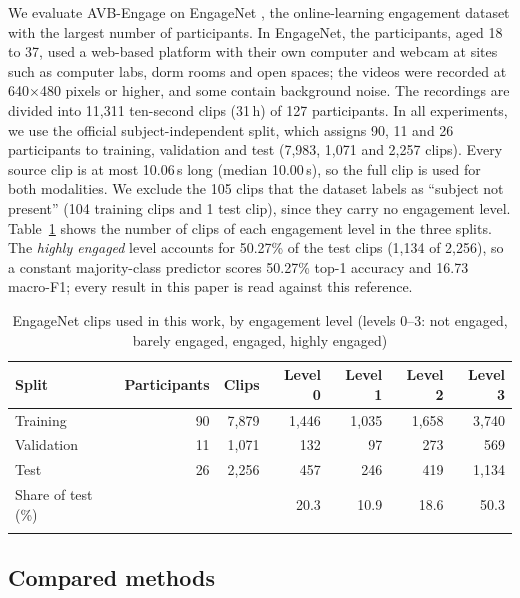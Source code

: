 \documentclass[pdflatex,iicol,sn-basic]{sn-jnl}
\newcommand{\ournet}{AVB-Engage}
\begin{document}
We evaluate \ournet{} on EngageNet \citep{singh2023engagenet}, the online-learning engagement dataset with the largest number of participants. In EngageNet, the participants, aged 18 to 37, used a web-based platform with their own computer and webcam at sites such as computer labs, dorm rooms and open spaces; the videos were recorded at 640$\times$480 pixels or higher, and some contain background noise. The recordings are divided into 11,311 ten-second clips (31\,h) of 127 participants. In all experiments, we use the official subject-independent split, which assigns 90, 11 and 26 participants to training, validation and test (7,983, 1,071 and 2,257 clips). Every source clip is at most 10.06\,s long (median 10.00\,s), so the full clip is used for both modalities. We exclude the 105 clips that the dataset labels as ``subject not present'' (104 training clips and 1 test clip), since they carry no engagement level. Table~\ref{tab:dataset} shows the number of clips of each engagement level in the three splits. The \emph{highly engaged} level accounts for 50.27\% of the test clips (1,134 of 2,256), so a constant majority-class predictor scores 50.27\% top-1 accuracy and 16.73 macro-F1; every result in this paper is read against this reference.

\begin{table}[t]
\caption{EngageNet clips used in this work, by engagement level (levels 0--3: not engaged, barely engaged, engaged, highly engaged)}\label{tab:dataset}
\begin{tabular*}{\textwidth}{@{\extracolsep\fill}lrrrrrr}
\toprule
Split & Participants & Clips & Level 0 & Level 1 & Level 2 & Level 3\\
\midrule
Training & 90 & 7,879 & 1,446 & 1,035 & 1,658 & 3,740\\
Validation & 11 & 1,071 & 132 & 97 & 273 & 569\\
Test & 26 & 2,256 & 457 & 246 & 419 & 1,134\\
\midrule
Share of test (\%) & & & 20.3 & 10.9 & 18.6 & 50.3\\
\botrule
\end{tabular*}
\end{table}

\subsection{Compared methods}\label{sec:baselines}
\end{document}

